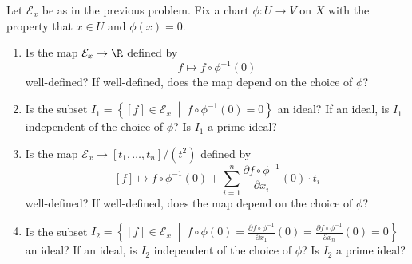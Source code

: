\documentclass[10pt]{amsart}
\begin{document}
\begin{thm}
  Let $\mathcal{E}_x$ be as in the previous problem.
  Fix a chart $\phi \colon U \rightarrow V$ on $X$ with the property that $x \in U$ and $\phi(x) = 0$.
  \begin{enumerate}
  \item\label{5.1}
    Is the map $\mathcal{E}_x \rightarrow \R$ defined by
    $$f \mapsto f \circ \phi^{-1}(0)$$
    well-defined?
    If well-defined, does the map depend on the choice of $\phi$?
  \item
    Is the subset $I_1 = \left\{ [f] \in \mathcal{E}_x \;\middle\vert\; f \circ \phi^{-1}(0) = 0 \right\}$ an ideal?
    If an ideal, is $I_1$ independent of the choice of $\phi$?
    Is $I_1$ a prime ideal?
  \item
    Is the map $\mathcal{E}_x \rightarrow[t_1, \ldots, t_n]/(t^2)$ defined by
    $$[f] \mapsto f\circ \phi^{-1}(0) + \sum_{i=1}^n \frac{\partial f \circ \phi^{-1}}{\partial x_i}(0) \cdot t_i$$
    well-defined?
    If well-defined, does the map depend on the choice of $\phi$?
  \item
    Is the subset $I_2 = \left\{ [f] \in \mathcal{E}_x \;\middle\vert\; f \circ \phi(0) = \frac{\partial f \circ \phi^{-1}}{\partial x_1}(0) = \frac{\partial f \circ \phi^{-1}}{\partial x_n}(0) = 0\right\}$ an ideal?
    If an ideal, is $I_2$ independent of the choice of $\phi$?
    Is $I_2$ a prime ideal?
  \end{enumerate}
  

\end{thm}
\end{document}
